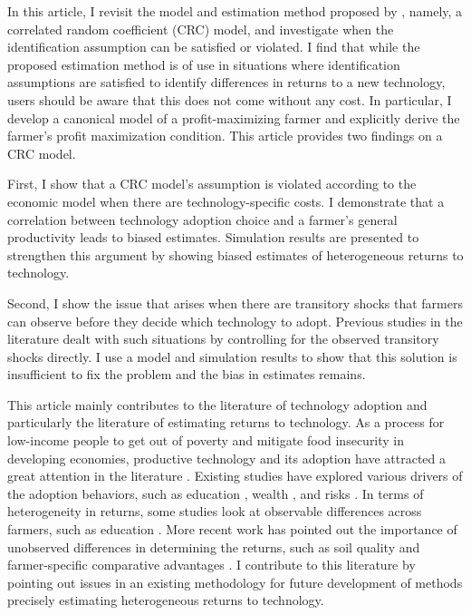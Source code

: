 \documentclass[11pt,letterpaper]{article}
\begin{document}
In this article, I revisit the model and estimation method proposed by \citet{Suri11}, namely, a correlated random coefficient (CRC) model, and investigate when the identification assumption can be satisfied or violated.
I find that while the proposed estimation method is of use in situations where identification assumptions are satisfied to identify differences in returns to a new technology, users should be aware that this does not come without any cost.
In particular, I develop a canonical model of a profit-maximizing farmer and explicitly derive the farmer's profit maximization condition.
This article provides two findings on a CRC model.

First, I show that a CRC model's assumption is violated according to the economic model when there are technology-specific costs.
I demonstrate that a correlation between technology adoption choice and a farmer's general productivity leads to biased estimates.
Simulation results are presented to strengthen this argument by showing biased estimates of heterogeneous returns to technology.

Second, I show the issue that arises when there are transitory shocks that farmers can observe before they decide which technology to adopt.
Previous studies in the literature dealt with such situations by controlling for the observed transitory shocks directly.
I use a model and simulation results to show that this solution is insufficient to fix the problem and the bias in estimates remains.

This article mainly contributes to the literature of technology adoption and particularly the literature of estimating returns to technology.
As a process for low-income people to get out of poverty and mitigate food insecurity in developing economies, productive technology and its adoption have attracted a great attention in the literature \citep{feder1985adoption, foster2010microeconomics}.
Existing studies have explored various drivers of the adoption behaviors, such as education \citep{weir2000adoption}, wealth \citep{moser2006complex}, and risks \citep{dercon2011consumption}.
In terms of heterogeneity in returns, some studies look at observable differences across farmers, such as education \citep{foster1996technical}.
More recent work has pointed out the importance of unobserved differences in determining the returns, such as soil quality \citep{munshi2004social, foster2010microeconomics} and farmer-specific comparative advantages \citep{Suri11, Michler2019}.
I contribute to this literature by pointing out issues in an existing methodology for future development of methods precisely estimating heterogeneous returns to technology.
\end{document}
